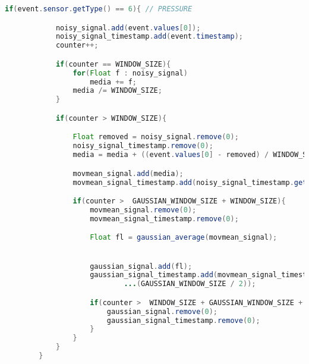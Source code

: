 \begin{lstlisting}[language=Java,  basicstyle=\footnotesize]
 	 if(event.sensor.getType() == 6){ // PRESSURE

            noisy_signal.add(event.values[0]);
            noisy_signal_timestamp.add(event.timestamp);
            counter++;

            if(counter == WINDOW_SIZE){
                for(Float f : noisy_signal)
                    media += f;
                media /= WINDOW_SIZE;
            }

            if(counter > WINDOW_SIZE){

                Float removed = noisy_signal.remove(0);
                noisy_signal_timestamp.remove(0);
                media = media + ((event.values[0] - removed) / WINDOW_SIZE);

                movmean_signal.add(media);
                movmean_signal_timestamp.add(noisy_signal_timestamp.get(WINDOW_SIZE/2));

                if(counter >  GAUSSIAN_WINDOW_SIZE + WINDOW_SIZE){
                    movmean_signal.remove(0);
                    movmean_signal_timestamp.remove(0);

                    Float fl = gaussian_average(movmean_signal);


                    gaussian_signal.add(fl);
                    gaussian_signal_timestamp.add(movmean_signal_timestamp.get...
							...(GAUSSIAN_WINDOW_SIZE / 2));

                    if(counter >  WINDOW_SIZE + GAUSSIAN_WINDOW_SIZE + PORTION_OF_SIGNAL){
                        gaussian_signal.remove(0);
                        gaussian_signal_timestamp.remove(0);
                    }
                }
            }
        }
\end{lstlisting}